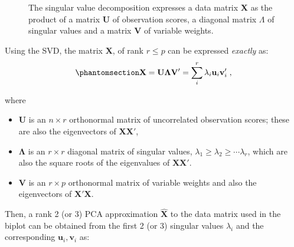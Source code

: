 \documentclass[
  letterpaper,
  10pt,
  krantz2]{krantz}
\providecommand{\tightlist}{%
  \setlength{\itemsep}{0pt}\setlength{\parskip}{0pt}}\usepackage{longtable,booktabs,array}
\begin{document}
\begin{figure}


\caption{\label{fig-svd-diagram}The singular value decomposition
expresses a data matrix \textbf{X} as the product of a matrix \textbf{U}
of observation scores, a diagonal matrix \(\Lambda\) of singular values
and a matrix \textbf{V} of variable weights.}

\end{figure}%

Using the SVD, the matrix \(\mathbf{X}\), of rank \(r \le p\) can be
expressed \emph{exactly} as:
\begin{equation}\phantomsection\label{eq-svd1}{
\mathbf{X} = \mathbf{U} \mathbf{\Lambda} \mathbf{V}'
                 = \sum_i^r \lambda_i \mathbf{u}_i \mathbf{v}_i' \; ,
}\end{equation}

where

\begin{itemize}
\tightlist
\item
  \(\mathbf{U}\) is an \(n \times r\) orthonormal matrix of uncorrelated
  observation scores; these are also the eigenvectors of
  \(\mathbf{X} \mathbf{X}'\),
\item
  \(\mathbf{\Lambda}\) is an \(r \times r\) diagonal matrix of singular
  values, \(\lambda_1 \ge \lambda_2 \ge \cdots \lambda_r\), which are
  also the square roots of the eigenvalues of
  \(\mathbf{X} \mathbf{X}'\).
\item
  \(\mathbf{V}\) is an \(r \times p\) orthonormal matrix of variable
  weights and also the eigenvectors of \(\mathbf{X}' \mathbf{X}\).
\end{itemize}

Then, a rank 2 (or 3) PCA approximation \(\widehat{\mathbf{X}}\) to the
data matrix used in the biplot can be obtained from the first 2 (or 3)
singular values \(\lambda_i\) and the corresponding
\(\mathbf{u}_i, \mathbf{v}_i\) as:
\end{document}
